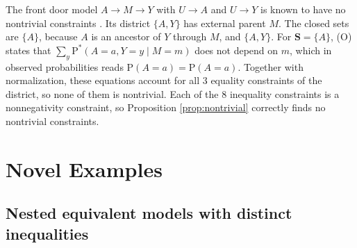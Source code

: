 \documentclass[12pt]{article}
\def\Pr{{\mathrm{P}}}
\def\Pdo{{\mathrm{P}^*}}
\newcommand{\bS}{\boldsymbol{S}}
\begin{document}
The front door model $A \rightarrow M \rightarrow Y$ with $U \rightarrow A$ and $U \rightarrow Y$ is known to have no nontrivial constraints \citep{pearl1995testability}. Its district $\{A, Y\}$ has external parent $M$. The closed sets are $\{A\}$, because $A$ is an ancestor of $Y$ through $M$, and $\{A, Y\}$. For $\bS = \{A\}$, (O) states that $\sum_y \Pdo(A = a, Y = y \mid M = m)$ does not depend on $m$, which in observed probabilities reads $\Pr(A = a) = \Pr(A = a)$. Together with normalization, these equations account for all 3 equality constraints of the district, so none of them is nontrivial. Each of the 8 inequality constraints is a nonnegativity constraint, so Proposition \ref{prop:nontrivial} correctly finds no nontrivial constraints.


\section{Novel Examples}
\subsection{Nested equivalent models with distinct inequalities}
\end{document}
